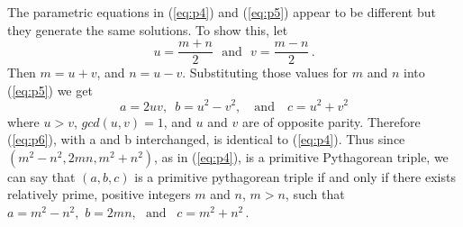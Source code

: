 \documentclass[12pt]{article}
\begin{document}
The parametric equations in (\ref{eq:p4}) and (\ref{eq:p5}) appear
to be different but they generate the same solutions. To show
this, let
\[
    u=\frac{m+n}{2}\,\, \mbox{ and } \,\,v=\frac{m-n}{2}\,.
\]
Then $m=u+v$, and $n=u-v$. Substituting those values for $m$ and
$n$ into (\ref{eq:p5}) we get
\begin{equation}
  a=2uv, \,\,\,  b=u^2-v^2, \quad \mbox{and} \quad c=u^2+v^2
\label{eq:p6}
\end{equation}
where $u > v$, $gcd(u,v)=1$, and $u$ and $v$ are of opposite
parity. Therefore (\ref{eq:p6}), with  a and b
interchanged, is identical to (\ref{eq:p4}). Thus since
$\left(m^2-n^2,2mn,m^2+n^2\right)$, as in (\ref{eq:p4}), is a
primitive Pythagorean triple, we can say that $(a,b,c)$ is a
primitive pythagorean triple if and only if there exists
relatively prime, positive integers $m$ and $n$, $m>n$, such that
$a=m^2-n^2,\,\, b=2mn,\,\,\mbox{ and } \,\,\, c=m^2+n^2$\,.
\end{document}
